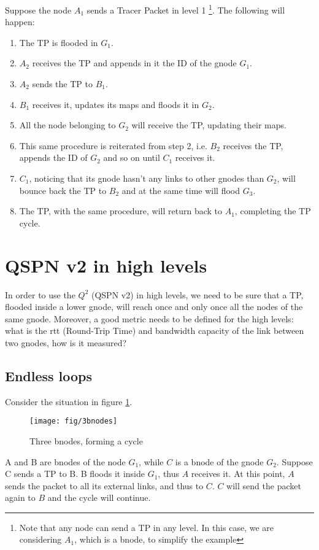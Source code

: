 \documentclass[a4paper]{article}
\begin{document}
Suppose the node $A_1$ sends a Tracer Packet in level 1 
\footnote{Note that any node can send a TP in any level. In this case, we are
considering $A_1$, which is a bnode, to simplify the example}. 
The following will happen:
\begin{enumerate}
	\item The TP is flooded in $G_1$.
	\item $A_2$ receives the TP and appends in it the ID of the gnode
		$G_1$.
	\item $A_2$ sends the TP to $B_1$.
	\item $B_1$ receives it, updates its maps and floods it in $G_2$.
	\item All the node belonging to $G_2$ will receive the TP, updating their
		maps.
	\item This same procedure is reiterated from step 2, i.e. $B_2$ receives
		the TP, appends the ID of $G_2$ and so on until $C_1$ receives
		it.
	\item $C_1$, noticing that its gnode hasn't any links to other gnodes
		than $G_2$, will bounce back the TP to $B_2$ and at the same
		time will flood $G_3$.
	\item The TP, with the same procedure, will return back to $A_1$,
		completing the TP cycle.
\end{enumerate}

\section{QSPN v2 in high levels}
In order to use the $Q^2$ (QSPN v2) in high levels, we need to be sure that a TP,
flooded inside a lower gnode, will reach once and only once all the nodes of
the same gnode. Moreover, a good metric needs to be defined for the high
levels: what is the rtt (Round-Trip Time) and bandwidth capacity of the link
between two gnodes, how is it measured?

\subsection{Endless loops}
Consider the situation in figure \ref{fig:3bnodes}.
\begin{figure}[h]
	\begin{center}
		\texttt{[image: fig/3bnodes]}
	\end{center}
	\caption{Three bnodes, forming a cycle}
	\label{fig:3bnodes}
\end{figure}
A and B are bnodes of the node $G_1$, while $C$ is a bnode of the gnode $G_2$.
Suppose C sends a TP to B. B floods it inside $G_1$, thus $A$ receives it. At
this point, $A$ sends the packet to all its external links, and thus to $C$.
$C$ will send the packet again to $B$ and the cycle will continue.\\
\end{document}

